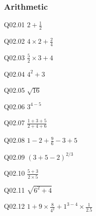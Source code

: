 \documentclass{book}
\newenvironment{problems}{}{}  %
\begin{document}
    
        \begin{problems}
        \subsubsection{Arithmetic}\label{arithmetic}

Q02.01 \(2 + \frac{1}{2}\)

Q02.02 \(4 \times 2 + \frac{2}{4}\)

Q02.03 \(\frac{5}{2} \times 3 + 4\)

Q02.04 \(4^2 + 3\)

Q02.05 \(\sqrt{16}\)

Q02.06 \(3^{4-5}\)

Q02.07 \(\frac{1+3+5}{2+4+6}\)

Q02.08 \(1 - 2 + \frac{9}{6} -3 + 5\)

Q02.09 \((3 + 5 -2)^{2/3}\)

Q02.10 \(\frac{5+3}{2 \times 5}\)

Q02.11 \(\sqrt{6^2 + 4}\)

Q02.12 \(1 + 9 \times \frac{8}{4^2} + 1^{3-4} \times \frac{1}{2.5}\)
        \end{problems}

    
\end{document}
